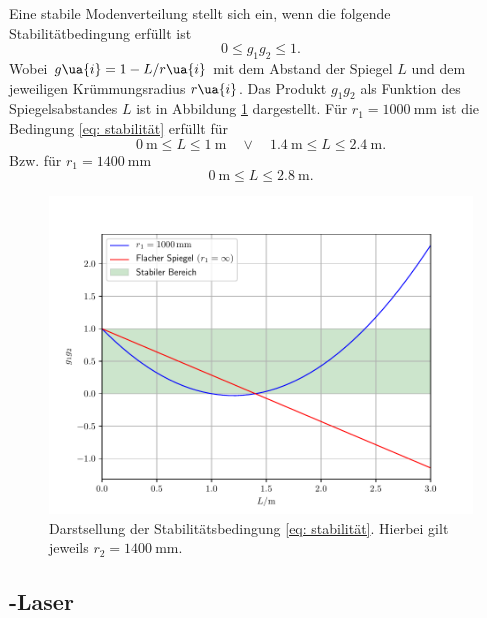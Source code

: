 Eine stabile Modenverteilung
stellt sich ein, wenn die folgende Stabilitätbedingung erfüllt ist
\begin{equation}
  0 \leq g_1 g_2 \leq 1.
  \label{eq: stabilität}
\end{equation}
Wobei $g\ua{i} = 1 - L/r\ua{i}$ mit dem Abstand der Spiegel $L$ und dem jeweiligen Krümmungsradius $r\ua{i}$. Das Produkt $g_1g_2$
als Funktion des Spiegelsabstandes $L$ ist in Abbildung \ref{fig: stabilitätsbedingung} dargestellt.
Für $r_1 = \SI{1000}{\milli\meter}$ ist die Bedingung \eqref{eq: stabilität} erfüllt für
\begin{equation}
  \SI{0}{\meter}\leq L \leq \SI{1}{\meter} \quad\lor\quad \SI{1.4}{\meter}\leq L \leq \SI{2.4}{\meter}.
\end{equation}
Bzw. für $r_1 = \SI{1400}{\milli\meter}$
\begin{equation}
  \SI{0}{\meter} \leq L \leq \SI{2.8}{\meter}.
\end{equation}
\begin{figure}
  \centering
  \includegraphics[width = \textwidth]{theorie_bilder/g_1_g_2.pdf}
  \caption{Darstsellung der Stabilitätsbedingung \eqref{eq: stabilität}. Hierbei gilt jeweils $r_2 = \SI{1400}{\milli\meter}$.}
  \label{fig: stabilitätsbedingung}
\end{figure}



\subsection{-Laser }
